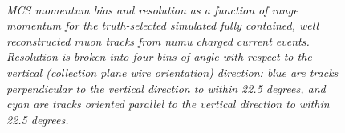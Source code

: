 \begin{figure}
\centering
\mbox{
	\quad
	}
\caption{\textit{MCS momentum bias and resolution as a function of range momentum for the truth-selected simulated fully contained, well reconstructed muon tracks from numu charged current events. Resolution is broken into four bins of angle with respect to the vertical (collection plane wire orientation) direction: blue are tracks perpendicular to the vertical direction to within 22.5 degrees, and cyan are tracks oriented parallel to the vertical direction to within 22.5 degrees.}}
\label{yangle_bias_resolution_fig}
\end{figure}




